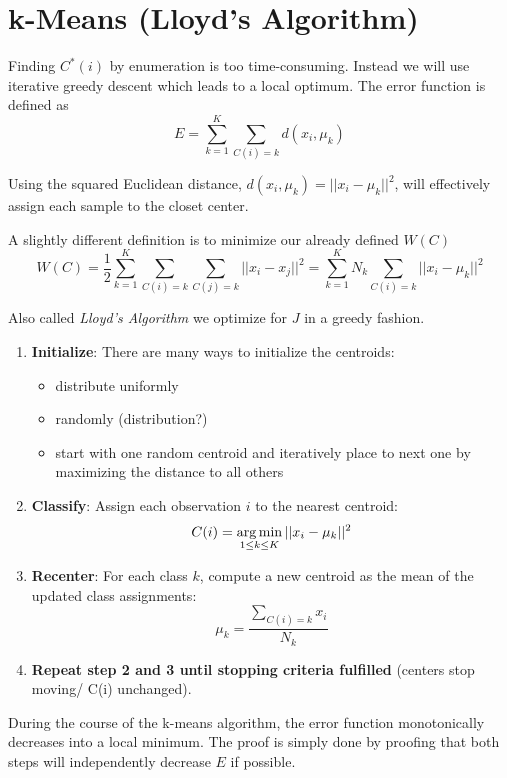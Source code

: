 \section{k-Means (Lloyd's Algorithm)}
Finding $C^*(i)$ by enumeration is too time-consuming. Instead we will use iterative greedy descent which leads to a local optimum.
The error function is defined as
\begin{equation}
E = \sum_{k=1}^K \sum_{C(i)=k} d(x_i, \mu_k)
\end{equation}

Using the squared Euclidean distance, $d(x_i, \mu_k) = ||x_i - \mu_k||^2$, will effectively assign each sample to the closet center.

A slightly different definition is to minimize our already defined $W(C)$
\begin{equation}
W(C) = \frac{1}{2} \sum\limits_{k=1}^K \sum\limits_{C(i)=k} \sum\limits_{C(j)=k} ||x_i - x_j||^2 = \sum\limits_{k=1}^K N_k \sum\limits_{C(i)=k} ||x_i - \mu_k||^2
\end{equation}

Also called \emph{Lloyd's Algorithm} we optimize for $J$ in a greedy fashion.
\begin{enumerate}
\item \textbf{Initialize}: There are many ways to initialize the centroids:
	\begin{itemize}
	\item distribute uniformly
	\item randomly (distribution?)
	\item start with one random centroid and iteratively place to next one by maximizing the distance to all others
	\end{itemize}
\item \textbf{Classify}: Assign each observation $i$ to the nearest centroid: $$C(i) = \operatorname*{arg\,min}\limits_{1\leq k \leq K} ||x_i - \mu_k||^2$$
\item \textbf{Recenter}: For each class $k$, compute a new centroid as the mean of the updated class assignments: $$\mu_k = \frac{\sum\limits_{C(i)=k} x_i}{N_k}$$
\item \textbf{Repeat step 2 and 3 until stopping criteria fulfilled} (\eg centers stop moving/ C(i) unchanged).
\end{enumerate}

During the course of the k-means algorithm, the error function monotonically decreases into a local minimum. The proof is simply done by proofing that both steps will independently decrease $E$ if possible.

